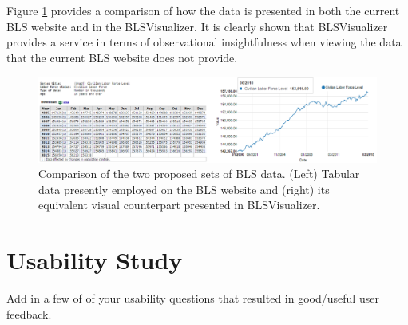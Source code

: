 \documentclass[journal]{IEEEtran}
\begin{document}
{Figure \ref{TablePlot} provides a comparison of how the data is presented in both the current BLS website and in the BLSVisualizer. It is clearly shown that BLSVisualizer provides a service in terms of observational insightfulness when viewing the data that the current BLS website does not provide.}

\begin{figure}[t]
\centering
    \includegraphics[width = 6.2in]{PlotTable.png}
    \caption{Comparison of the two proposed sets of BLS data. (Left) Tabular data presently employed on the BLS website and (right) its equivalent visual counterpart presented in BLSVisualizer.}
    \label{TablePlot}
\end{figure}   


\section{Usability Study}
Add in a few of of your usability questions that resulted in good/useful user feedback. 
\end{document}
